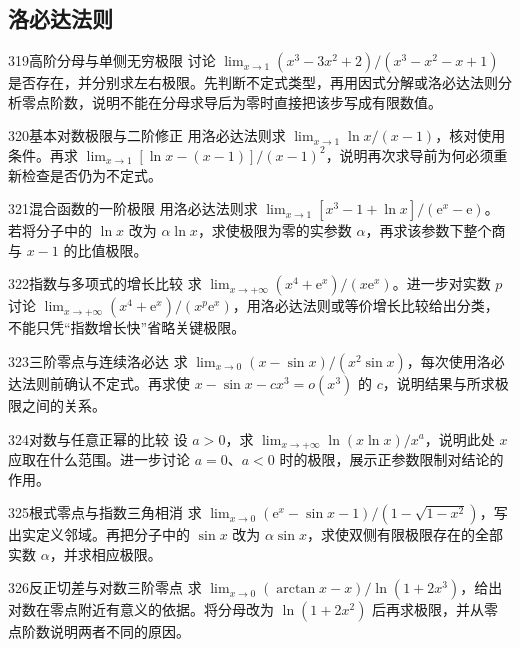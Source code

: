 \subsection{洛必达法则}
\begin{exercise}{319}{高阶分母与单侧无穷极限}
讨论 $\lim_{x\to1}(x^3-3x^2+2)/(x^3-x^2-x+1)$ 是否存在，并分别求左右极限。先判断不定式类型，再用因式分解或洛必达法则分析零点阶数，说明不能在分母求导后为零时直接把该步写成有限数值。
\end{exercise}
\begin{exercise}{320}{基本对数极限与二阶修正}
用洛必达法则求 $\lim_{x\to1}\ln x/(x-1)$，核对使用条件。再求 $\lim_{x\to1}[\ln x-(x-1)]/(x-1)^2$，说明再次求导前为何必须重新检查是否仍为不定式。
\end{exercise}
\begin{exercise}{321}{混合函数的一阶极限}
用洛必达法则求 $\lim_{x\to1}[x^3-1+\ln x]/(\mathrm e^x-\mathrm e)$。若将分子中的 $\ln x$ 改为 $\alpha\ln x$，求使极限为零的实参数 $\alpha$，再求该参数下整个商与 $x-1$ 的比值极限。
\end{exercise}
\begin{exercise}{322}{指数与多项式的增长比较}
求 $\lim_{x\to+\infty}(x^4+\mathrm e^x)/(x\mathrm e^x)$。进一步对实数 $p$ 讨论 $\lim_{x\to+\infty}(x^4+\mathrm e^x)/(x^p\mathrm e^x)$，用洛必达法则或等价增长比较给出分类，不能只凭“指数增长快”省略关键极限。
\end{exercise}
\begin{exercise}{323}{三阶零点与连续洛必达}
求 $\lim_{x\to0}(x-\sin x)/(x^2\sin x)$，每次使用洛必达法则前确认不定式。再求使 $x-\sin x-cx^3=o(x^3)$ 的 $c$，说明结果与所求极限之间的关系。
\end{exercise}
\begin{exercise}{324}{对数与任意正幂的比较}
设 $a>0$，求 $\lim_{x\to+\infty}\ln(x\ln x)/x^a$，说明此处 $x$ 应取在什么范围。进一步讨论 $a=0$、$a<0$ 时的极限，展示正参数限制对结论的作用。
\end{exercise}
\begin{exercise}{325}{根式零点与指数三角相消}
求 $\lim_{x\to0}(\mathrm e^x-\sin x-1)/(1-\sqrt{1-x^2})$，写出实定义邻域。再把分子中的 $\sin x$ 改为 $\alpha\sin x$，求使双侧有限极限存在的全部实数 $\alpha$，并求相应极限。
\end{exercise}
\begin{exercise}{326}{反正切差与对数三阶零点}
求 $\lim_{x\to0}(\arctan x-x)/\ln(1+2x^3)$，给出对数在零点附近有意义的依据。将分母改为 $\ln(1+2x^2)$ 后再求极限，并从零点阶数说明两者不同的原因。
\end{exercise}
